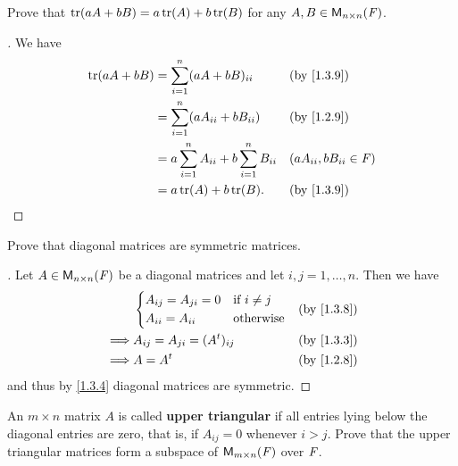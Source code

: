 \begin{ex}\label{ex:1.3.6}
	Prove that \(\tr[aA + bB] = a\tr[A] + b\tr[B]\) for any \(A, B \in \ms[n][n][\F]\).
\end{ex}

\begin{proof}[]
	We have
	\begin{align*}
		\tr[aA + bB] & = \sum_{i = 1}^n (aA + bB)_{i i}                      &  & \by{1.3.9}                  \\
		             & = \sum_{i = 1}^n (aA_{i i} + bB_{i i})                &  & \by{1.2.9}                  \\
		             & = a \sum_{i = 1}^n A_{i i} + b \sum_{i = 1}^n B_{i i} &  & (aA_{i i}, bB_{i i} \in \F) \\
		             & = a\tr[A] + b\tr[B].                                  &  & \by{1.3.9}
	\end{align*}
\end{proof}

\begin{ex}\label{ex:1.3.7}
	Prove that diagonal matrices are symmetric matrices.
\end{ex}

\begin{proof}[]
	Let \(A \in \ms[n][n][\F]\) be a diagonal matrices and let \(i, j = 1, \dots, n\).
	Then we have
	\begin{align*}
		         & \begin{dcases}
			           A_{i j} = A_{j i} = 0 & \text{if } i \neq j \\
			           A_{i i} = A_{i i}     & \text{otherwise}
		           \end{dcases} &  & \by{1.3.8}                    \\
		\implies & A_{i j} = A_{j i} = (\tp{A})_{i j}             &  & \by{1.3.3} \\
		\implies & A = \tp{A}                                     &  & \by{1.2.8}
	\end{align*}
	and thus by \cref{1.3.4} diagonal matrices are symmetric.
\end{proof}

\setcounter{ex}{11}
\begin{ex}\label{ex:1.3.12}
	An \(m \times n\) matrix \(A\) is called \textbf{upper triangular} if all entries lying below the diagonal entries are zero, that is, if \(A_{i j} = 0\) whenever \(i > j\).
	Prove that the upper triangular matrices form a subspace of \(\ms\) over \(\mathit{F}\).
\end{ex}

